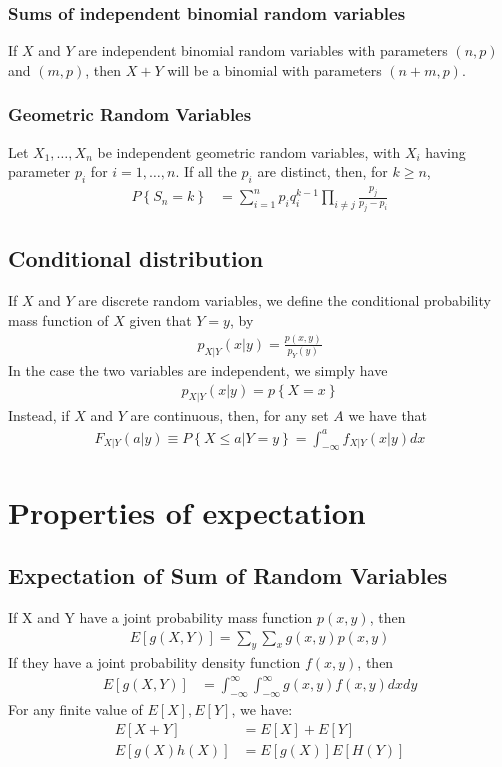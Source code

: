 \documentclass[a4paper]{article}
\begin{document}
\subsubsection{Sums of independent binomial random variables}
If $X$ and $Y$ are independent binomial random variables with parameters $(n,p)$ and $(m,p)$, then $X+Y$ will be a binomial with parameters $(n+m,p)$.
\subsubsection{Geometric Random Variables}
Let $X_1,\dots,X_n$ be independent geometric random variables, with $X_i$ having parameter $p_i$ for $i=1,\dots,n$.  If all the $p_i$ are distinct, then, for $k\geq n$, 
\begin{align}
  P\left\{ S_n = k \right\} & = \sum_{i=1}^{n} p_iq_i^{k-1} \prod_{i\neq j} \frac{p_j}{p_j-p_i}
\end{align}
\subsection{Conditional distribution} %
\label{sub:Conditional distribution}
If $X$ and $Y$ are discrete random variables, we define the conditional probability mass function of $X$ given that $Y=y$, by
\begin{align}
  p_{X|Y}(x|y) = \frac{p(x,y)}{p_Y(y)}
\end{align}
In the case the two variables are independent, we simply have
\begin{align}
  p_{X|Y}(x|y) = p\left\{ X=x \right\}
\end{align}
Instead, if $X$ and $Y$ are continuous, then, for any set $A$ we have that
\begin{align}
  F_{X|Y}(a|y) \equiv P\left\{ X \leq a | Y=y \right\} = \int_{-\infty}^{a}f_{X|Y}(x|y) dx
\end{align}
\section{Properties of expectation} %
\label{sec:Properties of expectation}
\subsection{Expectation of Sum of Random Variables} %
\label{sub:Expectation of SUm of Random Variables}
If X and Y have a joint probability mass function $p(x,y)$, then
\begin{align}
  E[g(X,Y)]=\sum_{y}\sum_{x}g(x,y)p(x,y)
\end{align}
If they have a joint probability density function $f(x,y)$, then
\begin{align}
  E[g(X,Y)] & = \int_{-\infty}^{\infty}\int_{-\infty}^{\infty} g(x,y)f(x,y) dxdy
\end{align}
For any finite value of $E[X],E[Y]$, we have:
\begin{align}
  E[X+Y] & = E[X]+E[Y] \\
  E[g(X)h(X)] & = E[g(X)]E[H(Y)] 
\end{align}
\end{document}
